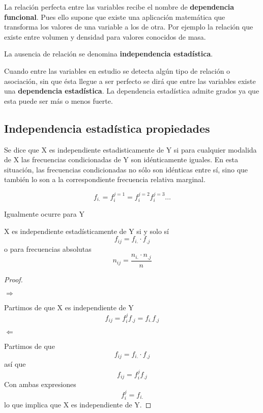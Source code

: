 \documentclass{article}
\theoremstyle{definition}
\begin{document}
 La relación perfecta entre las variables recibe el nombre de
 \textbf{dependencia funcional}. Pues ello supone que existe una aplicación
 matemática que transforma los valores de una variable a los de otra. Por
 ejemplo la relación que existe entre volumen y densidad para valores conocidos
 de masa.

 La ausencia de relación se denomina \textbf{independencia estadística}.

 Cuando entre las variables en estudio se detecta algún tipo de relación o
 asociación, sin que ésta llegue a ser perfecto se dirá que entre las variables
 existe una \textbf{dependencia estadística}. La dependencia estadística admite
 grados ya que esta puede ser más o menos fuerte.

 \subsection{Independencia estadística propiedades}

 Se dice que X es independiente estadisticamente de Y si para cualquier
 modalida de X las frecuencias condicionadas de Y son idénticamente iguales. En
 esta situación, las frecuencias condicionadas no sólo son idénticas entre sí,
 sino que también lo son a la correspondiente frecuencia relativa marginal.

 $$ f_{i.} = f_i^{j=1} = f_i^{j=2} f_i^{j=3} \ldots $$

 Igualmente ocurre para Y

 \vspace{0.5cm}

\begin{theorem}

X es independiente estadísticamente de Y si y solo sí $$ f_{ij} = f_{i.} \cdot
f_{.j} $$ o para frecuencias absolutas $$n_{ij} = \frac{n_{i.}\cdot n_{.j}}{n}$$
\end{theorem}

\begin{proof} $ $\newline

$\boxed{\Rightarrow}$

$ $\newline Partimos de que X es independiente de Y  $$f_{ij} = f_i^j f_{.j} =
f_{i.} f_{.j}$$

$\boxed{\Leftarrow}$

$ $\newline Partimos de que $$ f_{ij} = f_{i.} \cdot f_{.j} $$ así que $$ f_{ij} =
f_i^j f_{.j} $$ Con ambas expresiones $$f_i^j = f_{i.} $$ lo que implica que X
es independiente de Y. \end{proof}
\end{document}

